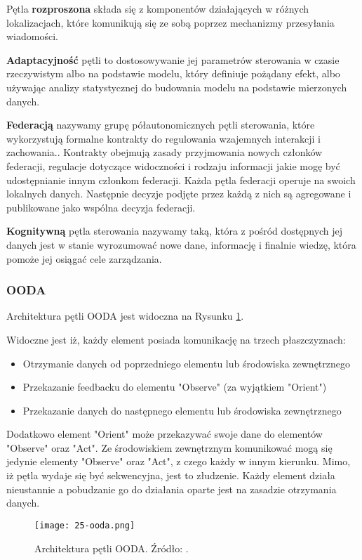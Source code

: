 Pętla \textbf{rozproszona} składa się z komponentów działających w różnych lokalizacjach, które komunikują się ze sobą poprzez mechanizmy przesyłania wiadomości. 

\textbf{Adaptacyjność} pętli to dostosowywanie jej parametrów sterowania w czasie rzeczywistym albo na podstawie modelu, który definiuje pożądany efekt, albo używając analizy statystycznej do budowania modelu na podstawie mierzonych danych.

\textbf{Federacją} nazywamy grupę półautonomicznych pętli sterowania, które wykorzystują formalne kontrakty do regulowania wzajemnych interakcji i zachowania.. Kontrakty obejmują zasady przyjmowania nowych członków federacji, regulacje dotyczące widoczności i rodzaju informacji jakie mogę być udostępnianie innym członkom federacji. Każda pętla federacji operuje na swoich lokalnych danych. Następnie decyzje podjęte przez każdą z nich są agregowane i publikowane jako wspólna decyzja federacji.

\textbf{Kognitywną} pętla sterowania nazywamy taką, która z pośród dostępnych jej danych jest w stanie wyrozumować nowe dane, informację i finalnie wiedzę, która pomoże jej osiągać cele zarządzania.

\subsubsection{OODA}
Architektura pętli OODA \cite{boyd1995} jest widoczna na Rysunku \ref{fig:25-ooda}.

Widoczne jest iż, każdy element posiada komunikację na trzech płaszczyznach:
\begin{itemize}
    \item Otrzymanie danych od poprzedniego elementu lub środowiska zewnętrznego
    \item Przekazanie feedbacku do elementu "Observe" (za wyjątkiem "Orient")
    \item Przekazanie danych do następnego elementu lub środowiska zewnętrznego
\end{itemize}

Dodatkowo element "Orient" może przekazywać swoje dane do elementów "Observe" oraz "Act". Ze środowiskiem zewnętrznym komunikować mogą się jedynie elementy "Observe" oraz "Act", z czego każdy w innym kierunku. Mimo, iż pętla wydaje się być sekwencyjna, jest to złudzenie. Każdy element działa nieustannie a pobudzanie go do działania oparte jest na zasadzie otrzymania danych.


\begin{figure}[!h]
    \centering \texttt{[image: 25-ooda.png]}
    \caption{Architektura pętli OODA. Źródło: \cite{etsieni2024}.}\label{fig:25-ooda}
\end{figure}

